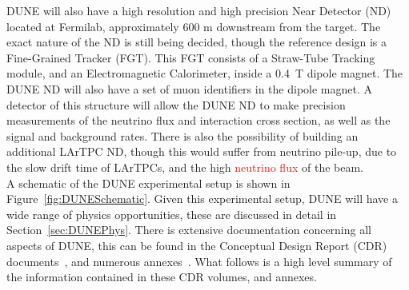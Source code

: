 DUNE will also have a high resolution and high precision Near Detector (ND) located at Fermilab, approximately 600 m downstream from the target. The exact nature of the ND is still being decided, though the reference design is a Fine-Grained Tracker (FGT). This FGT consists of a Straw-Tube Tracking module, and an Electromagnetic Calorimeter, inside a 0.4~T dipole magnet. The DUNE ND will also have a set of muon identifiers in the dipole magnet. A detector of this structure will allow the DUNE ND to make precision measurements of the neutrino flux and interaction cross section, as well as the signal and background rates. There is also the possibility of building an additional LArTPC ND, though this would suffer from neutrino pile-up, due to the slow drift time of LArTPCs, and the high \textcolor{red}{neutrino flux} of the beam. \\

A schematic of the DUNE experimental setup is shown in Figure~\ref{fig:DUNESchematic}. Given this experimental setup, DUNE will have a wide range of physics opportunities, these are discussed in detail in Section~\ref{sec:DUNEPhys}. There is extensive documentation concerning all aspects of DUNE, this can be found in the Conceptual Design Report (CDR) documents~\citep{DUNECDR_V1, DUNECDR_V2, DUNECDR_V3, DUNECDR_V4}, and numerous annexes~\citep{DUNEAtWork}. What follows is a high level summary of the information contained in these CDR volumes, and annexes. \\ 

